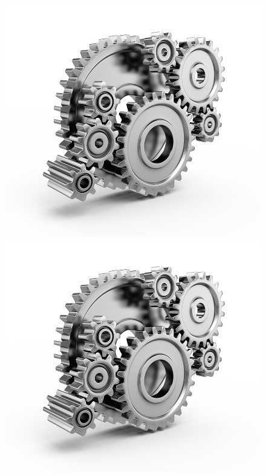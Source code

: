 \documentclass[11pt]{article}
\begin{document}
\begin{figure}[!ht]
\begin{minipage}[b]{.3\linewidth}
\centering
\includegraphics[width=0.9\linewidth]{Src/Images/image.png}
\end{minipage}%
\begin{minipage}[b]{.3\linewidth}
\centering
\includegraphics[width=0.9\linewidth]{Src/Images/image.png}
\end{minipage}
\begin{minipage}[b]{.3\linewidth}
\centering

\end{minipage}
\end{figure}
\end{document}
